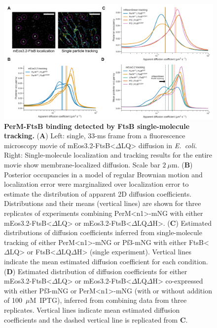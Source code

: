 \documentclass[twocolumn,pdflatex,sn-nature]{sn-jnl}%
\def\textsuperscript#1{<#1>}%
\newcommand\ec{\textit{E.~coli}}
\newcommand\ftsbdLQ{FtsB\textsuperscript{$\Delta{}$LQ}}
\newcommand\ftsbdLQdH{FtsB\textsuperscript{$\Delta{}$LQ$\Delta{}$H}}
\newcommand\permN{PerM\textsuperscript{n1}}
\begin{document}
\begin{figure}[b]
    \centering
    \includegraphics[width=1.0\textwidth]{../figures/fig4.png}
    \caption{
        \textbf{PerM-FtsB binding detected by FtsB single-molecule tracking.}
        (\textbf{A}) Left: single, 33-ms frame from a fluorescence microscopy movie of mEos3.2-\ftsbdLQ{} diffusion in \ec{}. Right: Single-molecule localization and tracking results for the entire movie show membrane-localized diffusion. Scale bar $2~\mu$m.
        (\textbf{B}) Posterior occupancies in a model of regular Brownian motion and localization error were marginalized over localization error to estimate the distribution of apparent 2D diffusion coefficients. Distributions and their means (vertical lines) are shown for three replicates of experiments combining \permN{}-mNG with either mEos3.2-\ftsbdLQ{} or mEos3.2-\ftsbdLQdH{}.
        (\textbf{C}) Estimated distributions of diffusion coefficients inferred from single-molecule tracking of either \permN{}-mNG or Pf3-mNG with either \ftsbdLQ{} or \ftsbdLQdH{} (single experiment). Vertical lines indicate the mean estimated diffusion coefficient for each condition.
        (\textbf{D}) Estimated distribution of diffusion coefficients for either mEos3.2-\ftsbdLQ{} or mEos3.2-\ftsbdLQdH{} co-expressed with either Pf3-mNG or \permN{}-mNG (with or without addition of 100~$\mu$M~IPTG), inferred from combining data from three replicates. Vertical lines indicate mean estimated diffusion coefficients and the dashed vertical line is replicated from \textbf{C}.
    }\label{fig4}
\end{figure}
\end{document}
